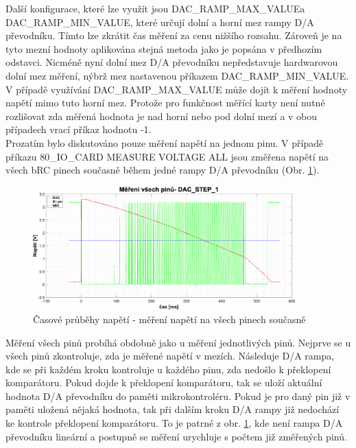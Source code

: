 Další konfigurace, které lze využít jsou DAC\_RAMP\_MAX\_VALUE\linebreak a DAC\_RAMP\_MIN\_VALUE,
které určují dolní a horní mez rampy D/A převodníku. Tímto lze zkrátit čas měření za cenu nižšího rozsahu.
Zároveň je na tyto mezní hodnoty aplikována stejná metoda jako je popsána v předhozím odstavci. Nicméně nyní dolní mez D/A převodníku nepředstavuje hardwarovou dolní mez měření,
nýbrž mez nastavenou příkazem DAC\_RAMP\_MIN\_VALUE. V případě využívání DAC\_RAMP\_MAX\_VALUE může dojít k měření hodnoty napětí mimo tuto horní mez. Protože pro funkčnost měřící karty není
nutné rozlišovat zda měřená hodnota je nad horní nebo pod dolní mezí a v obou případech vrací příkaz hodnotu -1.\\ 

Prozatím  bylo diskutováno pouze měření napětí na jednom pinu.
V případě \linebreak příkazu 80\_IO\_CARD MEASURE VOLTAGE ALL jsou změřena napětí na všech bRC pinech současně během jedné rampy
D/A převodníku (Obr. \ref{fig: bRC pin voltage measurement allpins}).

\begin{figure}[ht!]
    \centering
    \includegraphics[width = 0.9\textwidth]{obrazky/matlab_generated/all_pins.eps}
    \caption{Časové průběhy napětí - měření napětí na všech pinech současně}
    \label{fig: bRC pin voltage measurement allpins}
\end{figure}

Měření všech pinů probíhá obdobně jako u měření jednotlivých pinů. Nejprve se u všech pinů zkontroluje, zda je měřené napětí v mezích.
Následuje D/A rampa, kde se při každém kroku kontroluje u každého pinu, zda nedošlo k překlopení komparátoru. Pokud dojde k překlopení komparátoru,
tak se uloží aktuální hodnota D/A převodníku do paměti mikrokontroléru. Pokud je pro daný pin již v paměti uložená nějaká hodnota, tak při dalším
kroku D/A rampy již nedochází ke kontrole překlopení komparátoru. To je patrné z obr. \ref{fig: bRC pin voltage measurement allpins}, kde není rampa
D/A převodníku lineární a postupně se měření urychluje s počtem již změřených pinů.\\ 

